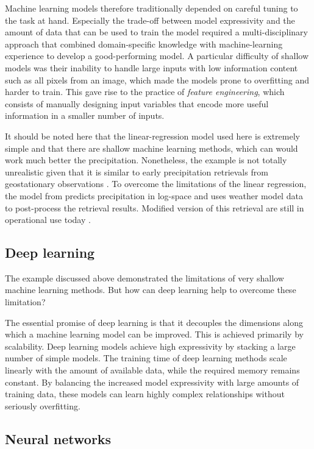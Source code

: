 \begin{description}
Machine learning models therefore traditionally depended on careful tuning to
the task at hand. Especially the trade-off between model expressivity and the
amount of data that can be used to train the model required a multi-disciplinary
approach that combined domain-specific knowledge with machine-learning
experience to develop a good-performing model. A particular difficulty of
shallow models was their inability to handle large inputs with low information
content such as all pixels from an image, which made the models prone to
overfitting and harder to train. This gave rise to the practice of
\textit{feature engineering}, which consists of manually designing input
variables that encode more useful information in a smaller number of inputs.

It should be noted here that the linear-regression model used here is extremely
simple and that there are shallow machine learning methods, which can would work
much better the precipitation. Nonetheless, the example is not totally
unrealistic given that it is similar to early precipitation retrievals from
geostationary observations \citep{vicente98}. To overcome the limitations of the
linear regression, the model from \citet{vicente98} predicts precipitation in
log-space and uses weather model data to post-process the retrieval results.
Modified version of this retrieval are still in operational use today
\citep{siqueira19}.

\subsection{Deep learning}

The example discussed above demonstrated the limitations of very shallow
machine learning methods. But how can deep learning help to overcome these
limitation?

The essential promise of deep learning is that it decouples the dimensions along
which a machine learning model can be improved. This is achieved primarily by
scalability. Deep learning models achieve high expressivity by stacking a large
number of simple models. The training time of deep learning methods scale
linearly with the amount of available data, while the required memory remains
constant. By balancing the increased model expressivity with large amounts of
training data, these models can learn highly complex relationships without
seriously overfitting.

  \subsection{Neural networks}


\end{description}
